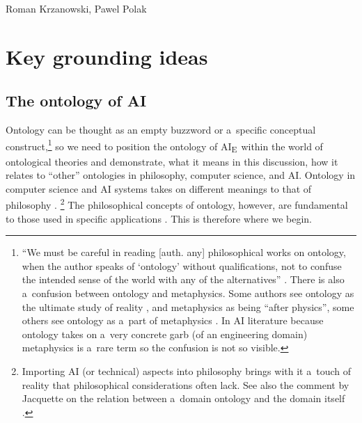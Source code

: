 \begin{artengenv2auth}{Roman Krzanowski, Pawel Polak}
\section*{Key grounding ideas}
\subsection*{The ontology of AI}

Ontology can be thought as an empty buzzword or a~specific conceptual construct,\footnote{``We must be careful in reading [auth. any] philosophical works on ontology, when the author speaks of ‘ontology' without qualifications, not to confuse the intended sense of the world with any of the alternatives''
\parencite[][p.3]{jacquette_ontology_2002}. %
 There is also a~confusion between ontology and metaphysics. Some authors see ontology as the ultimate study of reality 
\parencites[e.g.,][]{jacquette_ontology_2002}[][]{strozewski_ontologia_2004}[or][]{perzanowski_rozprawa_2015}, %
 and metaphysics as being ``after physics'', some others see ontology as a~part of metaphysics 
\parencite[see e.g.,][]{van_inwagen_metaphysics_2009}. %
 In AI literature because ontology takes on a~very concrete garb (of an engineering domain) metaphysics is a~rare term so the confusion is not so visible.} so we need to position the ontology of AI\textsubscript{E~}within the world of ontological theories and demonstrate, what it means in this discussion, how it relates to ``other'' ontologies in philosophy, computer science, and AI. Ontology in computer science and AI systems 
\parencites[e.g.,][]{sharman_road_2007}[as well][]{guarino_ontologies_1995}[][]{guarino_what_2009}[][]{swar_unified_2022} %
 takes on different meanings to that of philosophy 
\parencites[e.g.,][]{jacquette_ontology_2002}[][]{strozewski_ontologia_2004}[][]{baker_metaphysics_2007}[][]{chalmers_metametaphysics_2009}[][]{effingham_introduction_2013}[][]{berto_ontology_2015}[][]{perzanowski_rozprawa_2015}[][]{thomasson_ontology_2015}[][]{hofweber_logic_2021}.%
\footnote{Importing AI (or technical) aspects into philosophy brings with it a~touch of reality that philosophical considerations often lack. See also the comment by Jacquette on the relation between a~domain ontology and the domain itself 
\parencite[][p.5]{jacquette_ontology_2002}.%
} The philosophical concepts of ontology, however, are fundamental to those used in specific applications 
\parencite[see the comments of][p.XII]{jacquette_ontology_2002}. %
 This is therefore where we begin.


\end{artengenv2auth}
